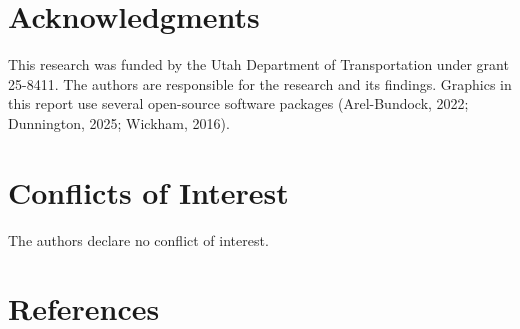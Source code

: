 \documentclass[
  letterpaper,
]{trb}
\begin{document}
\section*{Acknowledgments}\label{acknowledgments}


This research was funded by the Utah Department of Transportation under
grant 25-8411. The authors are responsible for the research and its
findings. Graphics in this report use several open-source software
packages (Arel-Bundock, 2022; Dunnington, 2025; Wickham, 2016).


\section*{Conflicts of Interest}\label{conflicts-of-interest}


The authors declare no conflict of interest.


\section*{References}\label{references}

\end{document}
